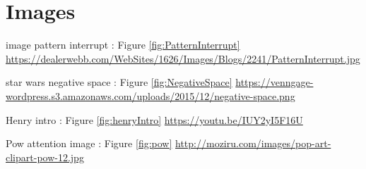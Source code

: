\documentclass{report}
\begin{document}
				
				
				\section{Images}
				
				
				image pattern interrupt : Figure \ref{fig:PatternInterrupt} \href{https://dealerwebb.com/WebSites/1626/Images/Blogs/2241/PatternInterrupt.jpg}{https://dealerwebb.com/WebSites/1626/Images/Blogs/2241/PatternInterrupt.jpg}
				
				star wars negative space : Figure \ref{fig:NegativeSpace} \href{https://venngage-wordpress.s3.amazonaws.com/uploads/2015/12/negative-space.png}{https://venngage-wordpress.s3.amazonaws.com/uploads/2015/12/negative-space.png}
				
				Henry intro : Figure \ref{fig:henryIntro} \href{https://youtu.be/IUY2yI5F16U}{https://youtu.be/IUY2yI5F16U}
				
				Pow attention image : Figure \ref{fig:pow}
				\href{http://moziru.com/images/pop-art-clipart-pow-12.jpg}{http://moziru.com/images/pop-art-clipart-pow-12.jpg}
				
				
				
		
\end{document}
